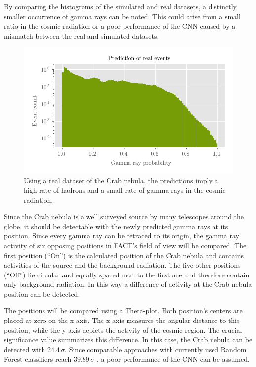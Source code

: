 By comparing the histograms of the simulated and real datasets,
a distinctly smaller occurrence of gamma rays can be noted.
This could arise from a small ratio in the cosmic radiation
or a poor performance of the CNN caused by a mismatch between the real and simulated datasets.

\begin{figure}
    \centering
    \includegraphics[scale=1]{Plots/CNN_Real_Evaluation.pdf}
    \caption{Using a real dataset of the Crab nebula, the predictions imply a high rate of hadrons and a small rate of gamma rays in the cosmic radiation.}
    \label{fig:cnn_real_evaluation}
\end{figure}

Since the Crab nebula is a well surveyed source by many telescopes around the globe,
it should be detectable with the newly predicted gamma rays at its position.
Since every gamma ray can be retraced to its origin,
the gamma ray activity of six opposing positions in FACT's field of view will be compared.
The first position (\enquote{On}) is the calculated position of the Crab nebula
and contains activities of the source and the background radiation.
The five other positions (\enquote{Off}) lie circular and equally spaced next to the first one
and therefore contain only background radiation.
In this way a difference of activity at the Crab nebula position can be detected.

The positions will be compared using a Theta-plot.
Both position's centers are placed at zero on the x-axis.
The x-axis measures the angular distance to this position,
while the y-axis depicts the activity of the cosmic region.
The crucial significance value summarizes this difference.
In this case, the Crab nebula can be detected with \num{24.4}\,$\sigma$.
Since comparable approaches with currently used Random Forest classifiers reach \num{39.89}\,$\sigma$ \cite{significance},
a poor performance of the CNN can be assumed.

